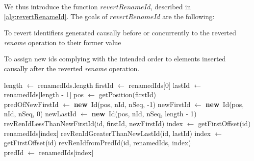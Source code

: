 \documentclass[10pt,journal,compsoc]{IEEEtran}
\newcommand{\new}{\textbf{new}}
\newcommand{\trm}[1]{\mathit{#1}}
\begin{document}
We thus introduce the function $\trm{revertRenameId}$, described in \autoref{alg:revertRenameId}.
The goals of $\trm{revertRenameId}$ are the following:
\begin{enumerate*}[label=(\roman*)]
    \item To revert identifiers generated causally before or concurrently to the reverted \emph{rename} operation to their former value
    \item To assign new ids complying with the intended order to elements inserted causally after the reverted \emph{rename} operation.
\end{enumerate*}

\begin{myalgorithm}
    \begin{algorithmic}
            \State length $\gets$ renamedIds.length
            \State firstId $\gets$ renamedIds[0]
            \State lastId $\gets$ renamedIds[length - 1]
            \State pos $\gets$ getPosition(firstId)
            \\
            \State predOfNewFirstId $\gets$ \new~Id(pos, nId, nSeq, -1)
            \State newFirstId $\gets$ \new~Id(pos, nId, nSeq, 0)
            \State newLastId $\gets$ \new~Id(pos, nId, nSeq, length - 1)
            \\
                \State \Return revRenIdLessThanNewFirstId(id, firstId, newFirstId)
                \State index $\gets$ getFirstOffset(id)
                \State \Return renamedIds[index]
                \State \Return revRenIdGreaterThanNewLastId(id, lastId)
            \Else
                \State index $\gets$ getFirstOffset(id)
                \State \Return revRenIdfromPredId(id, renamedIds, index)
            \EndIf
        \EndFunction
        \\
            \State predId $\gets$ renamedIds[index]

\end{algorithmic}
\end{myalgorithm}
\end{document}
